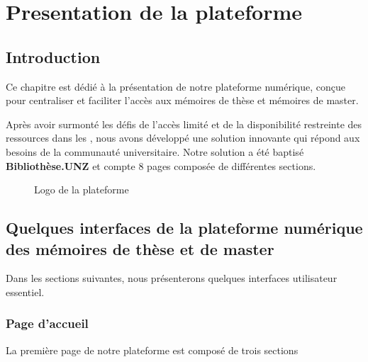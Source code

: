 \chapter{Presentation de la plateforme}
\begin{spacing}{1.2}
\minitoc
\thispagestyle{MyStyle}
\end{spacing}
\newpage

\section*{Introduction}
Ce chapitre est dédié à la présentation de notre plateforme numérique, conçue pour centraliser et faciliter l'accès aux mémoires de thèse et mémoires de master. \par
 Après avoir surmonté les défis de l'accès limité et de la disponibilité restreinte des ressources dans les , nous avons développé une solution innovante qui répond aux besoins de la communauté universitaire.
 Notre solution a été baptisé \textbf{Bibliothèse.UNZ} et compte 8 pages composée de différentes sections. 


\begin{figure}[H]%
    \center%
    \setlength{\fboxsep}{5pt}%
    \setlength{\fboxrule}{0.5pt}%
    \caption{Logo de la plateforme}%
\end{figure}

\section{Quelques interfaces de la plateforme numérique des mémoires de thèse et de master}
Dans les sections suivantes, nous présenterons quelques interfaces utilisateur essentiel.

\subsection{Page d'accueil}
La première page de notre plateforme est composé de trois sections

